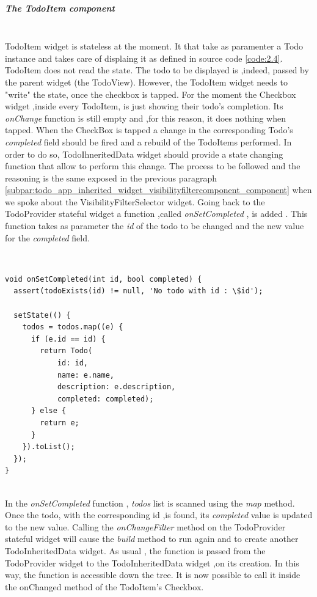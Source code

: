 \subparagraph{The TodoItem component}\mbox{}\\
\label{subpar:todo_app_inherited_widget_todoitem_component}
TodoItem widget is stateless at the moment. It that take as paramenter a Todo instance and takes care of displaing it as defined in source code  \ref{code:2.4}. TodoItem does not read the state. The todo to be displayed is ,indeed, passed by the parent widget (the TodoView). However, the TodoItem widget needs to "write" the state, once the checkbox is tapped. For the moment the Checkbox widget ,inside every TodoItem, is just showing their  todo's completion. Its \textit{onChange   }function is still empty and ,for this reason, it does nothing when tapped. When the CheckBox is tapped a change in the corresponding Todo’s \textit{completed }field should be fired and a rebuild of the TodoItems performed. In order to do so, TodoIhneritedData widget should provide a state changing function that allow to perform this change. The process to be followed and the reasoning is the same exposed in the previous paragraph \ref{subpar:todo_app_inherited_widget_visibilityfiltercomponent_component}  when we spoke about the VisibilityFilterSelector widget. Going back to the TodoProvider stateful widget a function ,called \textit{onSetCompleted  }, is added . This function takes as parameter the \textit{id} of the todo to be changed and the new value for the \textit{completed }field.
\mbox{}\\

\begin{code}

\mbox{}\\
\label{code:2.27}
\begin{verbatim}
void onSetCompleted(int id, bool completed) {
  assert(todoExists(id) != null, 'No todo with id : \$id');

  setState(() {
    todos = todos.map((e) {
      if (e.id == id) {
        return Todo(
            id: id,
            name: e.name,
            description: e.description,
            completed: completed);
      } else {
        return e;
      }
    }).toList();
  });
}
\end{verbatim}
\end{code}
\mbox{}\\
In the \textit{onSetCompleted }function , \textit{todos }list is scanned using the \textit{map }method. Once the todo, with the corresponding id ,is found, its \textit{completed }value is updated to the new value. Calling the \textit{onChangeFilter }method on the TodoProvider stateful widget will cause the \textit{build}  method to run again and to create another TodoInheritedData widget. As usual , the function is passed from the TodoProvider widget to the TodoInheritedData widget ,on its creation. In this way, the function is accessible down the tree. It is now possible to call it inside the onChanged method of the TodoItem's Checkbox.


